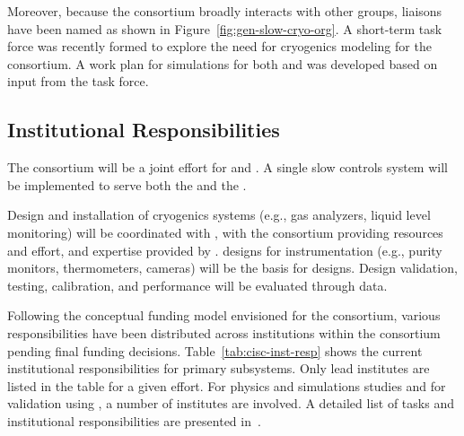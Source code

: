 Moreover, because the  consortium broadly interacts with other groups, liaisons have been named as shown in Figure~\ref{fig:gen-slow-cryo-org}. 
A short-term task force was recently formed to explore the need for cryogenics modeling for the consortium. A work plan for  simulations for both  and  was developed based on input from the task force. 


\subsection{Institutional Responsibilities}

The  consortium  
will be a joint  effort for  and . %
A single slow controls system will be implemented to serve both the  and the .

Design and installation of cryogenics systems (e.g., gas analyzers, liquid level monitoring) 
will be coordinated with , with the consortium providing resources and effort, and expertise provided by .  designs for  instrumentation (e.g., purity monitors, thermometers, cameras) will be the basis for  designs. Design validation, testing, calibration, and performance will be evaluated through  data.

Following the conceptual funding model envisioned for the consortium, various responsibilities have been distributed across institutions within the consortium pending final funding decisions.
Table~\ref{tab:cisc-inst-resp} shows the current institutional responsibilities for primary  subsystems. Only lead institutes are listed in the table for a given effort. For physics and simulations studies and for validation using , a number of institutes are involved. A detailed list of tasks and institutional responsibilities are presented in~\cite{bib:docdb5609}.

